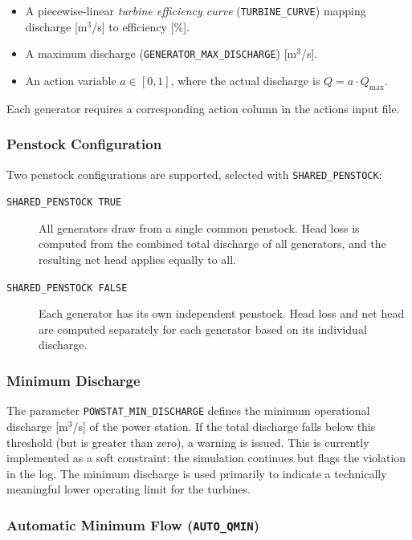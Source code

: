 \documentclass[a4paper, 12pt]{report}
\begin{document}
	\begin{itemize}
		\item A piecewise-linear \emph{turbine efficiency curve} (\texttt{TURBINE\_CURVE})
		mapping discharge [m$^3$/s] to efficiency [\%].
		\item A maximum discharge (\texttt{GENERATOR\_MAX\_DISCHARGE}) [m$^3$/s].
		\item An action variable $a \in [0, 1]$, where the actual discharge is
		$Q = a \cdot Q_\mathrm{max}$.
	\end{itemize}

	Each generator requires a corresponding action column in the actions input file.

	\subsubsection{Penstock Configuration}

	Two penstock configurations are supported, selected with \texttt{SHARED\_PENSTOCK}:

	\begin{description}
		\item[\texttt{SHARED\_PENSTOCK TRUE}] All generators draw from a single common penstock.
		Head loss is computed from the combined total discharge of all generators, and the
		resulting net head applies equally to all.
	
		\item[\texttt{SHARED\_PENSTOCK FALSE}] Each generator has its own independent penstock.
		Head loss and net head are computed separately for each generator based on its
		individual discharge.
	\end{description}


	\subsubsection{Minimum Discharge}

	The parameter \texttt{POWSTAT\_MIN\_DISCHARGE} defines the minimum operational discharge
	[m$^3$/s] of the power station. If the total discharge falls below this threshold (but is
	greater than zero), a warning is issued. This is currently implemented as a soft constraint:
	the simulation continues but flags the violation in the log. The minimum discharge is used
	primarily to indicate a technically meaningful lower operating limit for the turbines.

	\subsubsection{Automatic Minimum Flow (\texttt{AUTO\_QMIN})}
\end{document}
